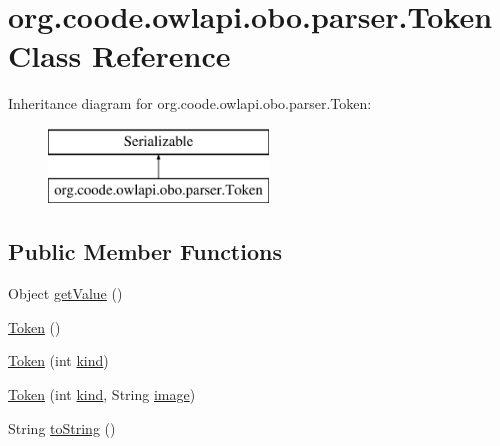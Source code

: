 \hypertarget{classorg_1_1coode_1_1owlapi_1_1obo_1_1parser_1_1_token}{\section{org.\-coode.\-owlapi.\-obo.\-parser.\-Token Class Reference}
\label{classorg_1_1coode_1_1owlapi_1_1obo_1_1parser_1_1_token}
}
Inheritance diagram for org.\-coode.\-owlapi.\-obo.\-parser.\-Token\-:\begin{figure}[H]
\begin{center}
\leavevmode
\includegraphics[height=2.000000cm]{classorg_1_1coode_1_1owlapi_1_1obo_1_1parser_1_1_token}
\end{center}
\end{figure}
\subsection*{Public Member Functions}
\begin{DoxyCompactItemize}
\item 
Object \hyperlink{classorg_1_1coode_1_1owlapi_1_1obo_1_1parser_1_1_token_a862705e3598326bb81315f24b2f45a93}{get\-Value} ()
\item 
\hyperlink{classorg_1_1coode_1_1owlapi_1_1obo_1_1parser_1_1_token_a53b31f9cbb79ea3a9e2ffffaafdc86e9}{Token} ()
\item 
\hyperlink{classorg_1_1coode_1_1owlapi_1_1obo_1_1parser_1_1_token_ae486e4a4b87f3711057932ca8f6fb898}{Token} (int \hyperlink{classorg_1_1coode_1_1owlapi_1_1obo_1_1parser_1_1_token_a7655f501650fe2880c1e315bc3c65418}{kind})
\item 
\hyperlink{classorg_1_1coode_1_1owlapi_1_1obo_1_1parser_1_1_token_acd8bbd81950e90f5aa82c54827c6fba1}{Token} (int \hyperlink{classorg_1_1coode_1_1owlapi_1_1obo_1_1parser_1_1_token_a7655f501650fe2880c1e315bc3c65418}{kind}, String \hyperlink{classorg_1_1coode_1_1owlapi_1_1obo_1_1parser_1_1_token_a18075f34b0eceb6632d2aa5f1dec2aff}{image})
\item 
String \hyperlink{classorg_1_1coode_1_1owlapi_1_1obo_1_1parser_1_1_token_ae1b81d2801050b1b6fe88e89b722426e}{to\-String} ()
\end{DoxyCompactItemize}
